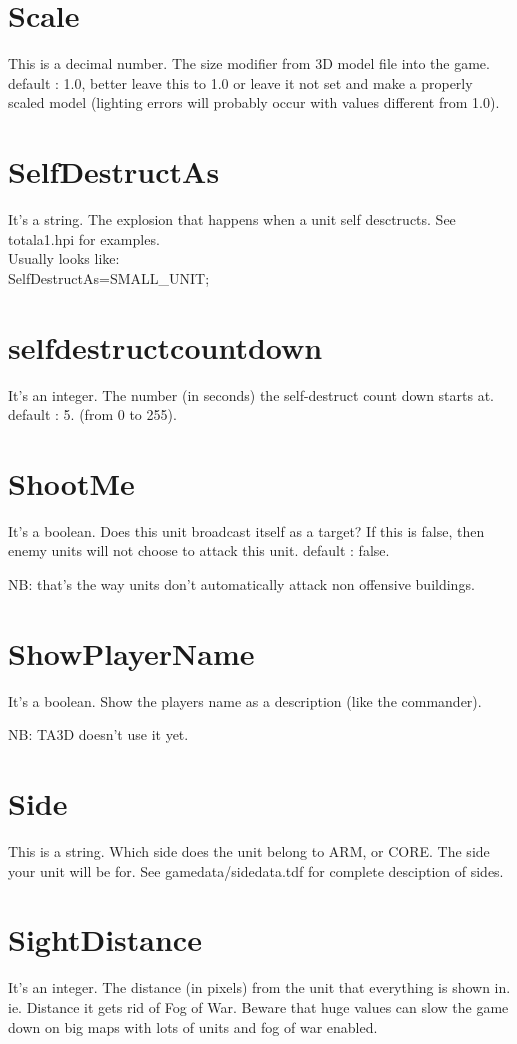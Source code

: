 \documentclass[a4paper,10pt]{article}
\begin{document}
\section{Scale}
This is a decimal number. The size modifier from 3D model file into the game. default : 1.0, better leave this to 1.0 or leave it not set and make a properly scaled model (lighting errors will probably occur with values different from 1.0).

\section{SelfDestructAs}
It's a string. The explosion that happens when a unit self desctructs. See totala1.hpi for examples.\\
Usually looks like:\\
SelfDestructAs=SMALL\_UNIT;

\section{selfdestructcountdown}
It's an integer. The number (in seconds) the self-destruct count down starts at. default : 5. (from 0 to 255).

\section{ShootMe}
It's a boolean. Does this unit broadcast itself as a target? If this is false, then enemy units will not choose to attack this unit. default : false.

NB: that's the way units don't automatically attack non offensive buildings.

\section{ShowPlayerName}
It's a boolean. Show the players name as a description (like the commander).

NB: TA3D doesn't use it yet.

\section{Side}
This is a string. Which side does the unit belong to ARM, or CORE. The side your unit will be for. See gamedata/sidedata.tdf for complete desciption of sides.

\section{SightDistance}
It's an integer. The distance (in pixels) from the unit that everything is shown in. ie. Distance it gets rid of Fog of War. Beware that huge values can slow the game down on big maps with lots of units and fog of war enabled.
\end{document}
